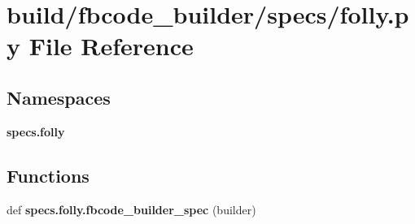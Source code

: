 \section{build/fbcode\+\_\+builder/specs/folly.py File Reference}
\label{folly_8py}
\subsection*{Namespaces}
\begin{DoxyCompactItemize}
\item 
 {\bf specs.\+folly}
\end{DoxyCompactItemize}
\subsection*{Functions}
\begin{DoxyCompactItemize}
\item 
def {\bf specs.\+folly.\+fbcode\+\_\+builder\+\_\+spec} (builder)
\end{DoxyCompactItemize}
